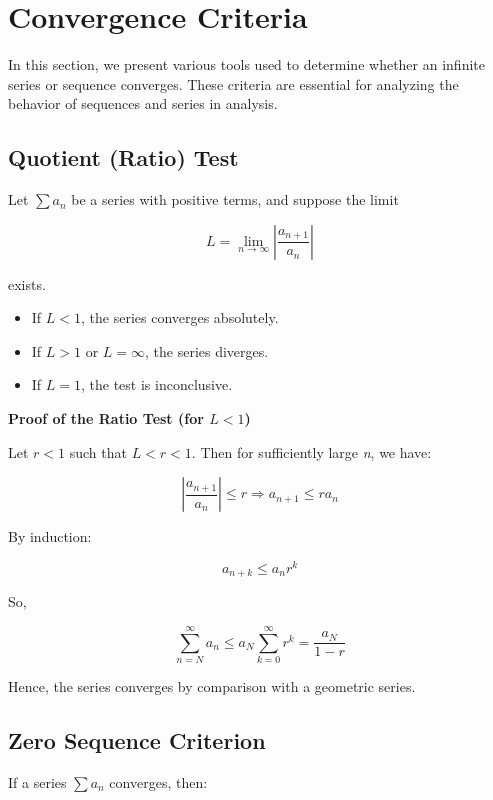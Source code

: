 \newpage
\section{Convergence Criteria}

In this section, we present various tools used to determine whether an infinite series or sequence converges. These criteria are essential for analyzing the behavior of sequences and series in analysis.

\subsection{Quotient (Ratio) Test}

Let \(\sum a_n\) be a series with positive terms, and suppose the limit

\[
  L = \lim_{n \to \infty} \left| \frac{a_{n+1}}{a_n} \right|
\]

exists.

\begin{itemize}
  
  \item If \(L < 1\), the series converges absolutely.

  \item If \(L > 1\) or \(L = \infty\), the series diverges.

  \item If \(L = 1\), the test is inconclusive.

\end{itemize}

\textbf{Proof of the Ratio Test (for \(L < 1\))}

Let \(r < 1\) such that \(L < r < 1\). Then for sufficiently large \emph{n}, we have:

\[
    \left| \frac{a_{n+1}}{a_n} \right| \le r \Rightarrow a_{n+1} \le r a_n
\]

By induction:

\[
    a_{n+k} \le a_n r^k
\]

So,

\[
    \sum_{n=N}^\infty a_n \le a_N \sum_{k=0}^\infty r^k = \frac{a_N}{1 - r}
\]

Hence, the series converges by comparison with a geometric series.

\subsection{Zero Sequence Criterion}

If a series \(\sum a_n\) converges, then:

